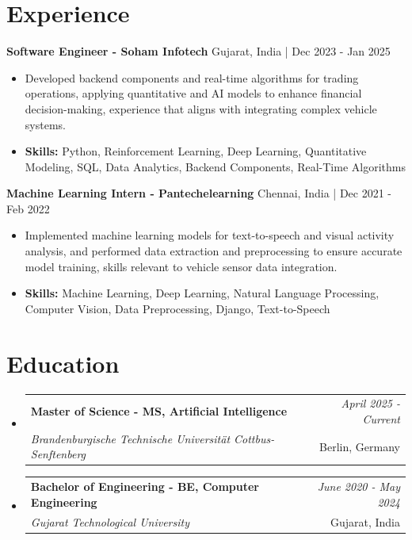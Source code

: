 \documentclass[a4paper,11pt]{article}
\makeatletter
\newcommand{\resumeSubheading}[4]{
\vspace{0.5mm}\item
    \begin{tabular*}{\linewidth}[t]{l@{\extracolsep{\fill}}r}
        \textbf{#1} & \textit{\footnotesize{#4}} \\
        \textit{\footnotesize{#3}} &  \footnotesize{#2}\\
    \end{tabular*}
    \vspace{-2.4mm}
}
\makeatother
\begin{document}
\section{\textbf{Experience}}


\vspace{1mm}
  \textbf{Software Engineer - Soham Infotech} \hfill Gujarat, India | Dec 2023 - Jan 2025
\vspace{-1.5mm} %
\begin{itemize}
  \item Developed backend components and real-time algorithms for trading operations, applying quantitative and AI models to enhance financial decision-making, experience that aligns with integrating complex vehicle systems.

\vspace{-2mm}
  \item \textbf{Skills:} Python, Reinforcement Learning, Deep Learning, Quantitative Modeling, SQL, Data Analytics, Backend Components, Real-Time Algorithms
\end{itemize}

\vspace{1mm}
  \textbf{Machine Learning Intern - Pantechelearning} \hfill Chennai, India | Dec 2021 - Feb 2022
\vspace{-1.5mm} %
\begin{itemize}
  \item Implemented machine learning models for text-to-speech and visual activity analysis, and performed data extraction and preprocessing to ensure accurate model training, skills relevant to vehicle sensor data integration.
\vspace{-2mm}
  \item \textbf{Skills:} Machine Learning, Deep Learning, Natural Language Processing, Computer Vision, Data Preprocessing, Django, Text-to-Speech
\end{itemize}\section{\textbf{Education}}
\vspace{-0.4mm}

\begin{itemize}[leftmargin=0.15in, label={}]
\resumeSubheading
{Master of Science - MS, Artificial Intelligence }{Berlin, Germany}
{Brandenburgische Technische Universität Cottbus-Senftenberg  }{April 2025 - Current}

\vspace{1.0mm} %
\resumeSubheading
{Bachelor of Engineering - BE, Computer Engineering  }{Gujarat, India}
{Gujarat Technological University }{June 2020 - May 2024}

\end{itemize}
\end{document}
